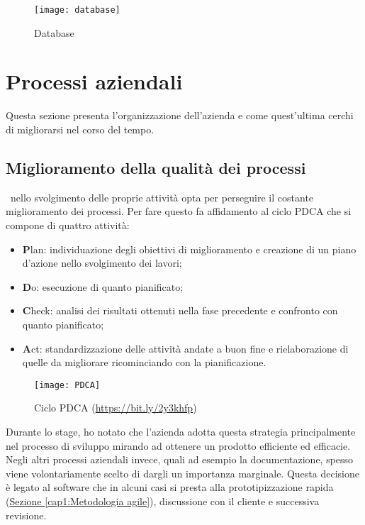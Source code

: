 \begin{figure}[!h] 
	\centering 
	\texttt{[image: database]} 
	\caption{Database}
\end{figure}


\section{Processi aziendali}
\label{cap1:Processi aziendali}

Questa sezione presenta l'organizzazione dell'azienda e come quest'ultima cerchi di migliorarsi nel corso del tempo. 

\subsection{Miglioramento della qualità dei processi}
\label{cap1:Miglioramento della qualità dei processi}

\azienda\ nello svolgimento delle proprie attività opta per perseguire il costante miglioramento dei processi. Per fare questo fa affidamento al ciclo PDCA che si compone di quattro attività:
\begin{itemize}
	\item \textbf{P}lan: individuazione degli obiettivi di miglioramento e creazione di un piano d'azione nello svolgimento dei lavori;
	\item \textbf{D}o: esecuzione di quanto pianificato;
	\item \textbf{C}heck: analisi dei risultati ottenuti nella fase precedente e confronto con quanto pianificato; 
	\item \textbf{A}ct: standardizzazione delle attività andate a buon fine e rielaborazione di quelle da migliorare ricominciando con la pianificazione.
\end{itemize}

\begin{figure}[!h] 
	\centering 
	\texttt{[image: PDCA]} 
	\caption{Ciclo PDCA (\url{https://bit.ly/2y3khfp})}
\end{figure}

Durante lo stage, ho notato che l'azienda adotta questa strategia principalmente nel processo di sviluppo mirando ad ottenere un prodotto efficiente ed efficacie. Negli altri processi aziendali invece, quali ad esempio la documentazione, spesso viene volontariamente scelto di dargli un importanza marginale. Questa decisione è legato al software che in alcuni casi si presta alla prototipizzazione rapida (\hyperref[cap1:Metodologia agile]{Sezione \ref{cap1:Metodologia agile}}), discussione con il cliente e successiva revisione. 
 
